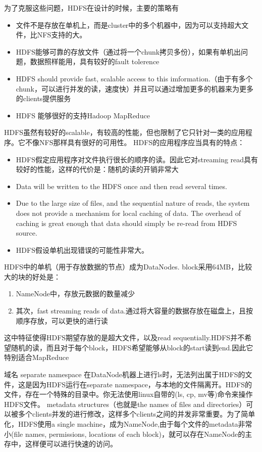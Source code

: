 为了克服这些问题，HDFS在设计的时候，主要的策略有
\begin{itemize}
  \item 文件不是存放在单机上，而是cluster中的多个机器中，因为可以支持超大文件，比NFS支持的大。
  \item HDFS能够可靠的存放文件（通过将一个chunk拷贝多份），如果有单机出问题，数据照样能用，具有较好的fault tolerence
  \item HDFS should provide fast, scalable access to this imformation.（由于有多个chunk，可以进行并发的读，速度快）并且可以通过增加更多的机器来为更多的clients提供服务
  \item HDFS 能够很好的支持Hadoop MapReduce
\end{itemize}
HDFS虽然有较好的scalable，有较高的性能，但也限制了它只针对一类的应用程序。它不像NFS那样具有很好的可用性。
HDFS的应用程序应当具有的特点：
\begin{itemize}
  \item HDFS假定应用程序对文件执行很长的顺序的读。因此它对streaming read具有较好的性能，这样的代价是：随机的读的开销非常大
  \item Data will be written to the HDFS once and then read several times.
  \item Due to the large size of files, and the sequential nature of reads, the system does not provide a mechanism for local caching of data. The overhead of caching is great enough that data should simply be re-read from HDFS source.
  \item HDFS假设单机出现错误的可能性非常大。
\end{itemize}

HDFS中的单机（用于存放数据的节点）成为DataNodes.
block采用64MB，比较大的块的好处是：
\begin{enumerate}
  \item NameNode中，存放元数据的数量减少
  \item 其次，fast streaming reads of data.通过将大容量的数据存放在磁盘上，且按顺序存放，可以更快的进行读
\end{enumerate}
这中特征使得HDFS期望存放的是超大文件，以及read sequentially.HDFS并不希望随机的读，而且对于每个block，HDFS希望能够从block的start读到end.因此它特别适合MapReduce

域名 separate namespace
在DataNode机器上进行ls时，无法列出属于HDFS的文件，这是因为HDFS运行在separate namespace，与本地的文件隔离开。HDFS的文件，存在一个特殊的目录中。你无法使用linux自带的(ls, cp, mv等)命令来操作HDFS文件。
metadata structures（也就是the names of files and directories）可以被多个clients并发的进行修改，这样多个clients之间的并发非常重要。为了简单化，HDFS使用a single machine，成为NameNode,由于每个文件的metadata非常小(file names, permissions, locations of each block)，就可以存在NameNode的主存中，这样便可以进行快速的访问。


